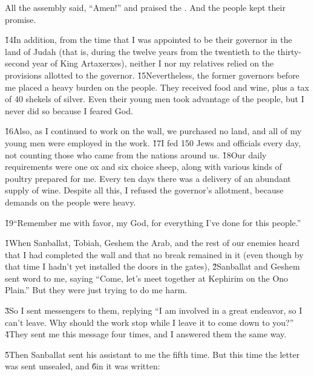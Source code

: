 All the assembly said, ``Amen!'' and praised the . And the people kept their promise.

\v{14}In addition, from the time that I was appointed to be their governor in the land of Judah (that is, during the twelve years from the twentieth to the thirty-second year of King Artaxerxes), neither I nor my relatives relied on the provisions allotted to the governor. \v{15}Nevertheless, the former governors before me placed a heavy burden on the people. They received food and wine, plus a tax of 40 shekels of silver. Even their young men took advantage of the people, but I never did so because I feared God.

\v{16}Also, as I continued to work on the wall, we purchased no land, and all of my young men were employed in the work. \v{17}I fed 150 Jews and officials every day, not counting those who came from the nations around us. \v{18}Our daily requirements were one ox and six choice sheep, along with various kinds of poultry prepared for me. Every ten days there was a delivery of an abundant supply of wine. Despite all this, I refused the governor's allotment, because demands on the people were heavy.

\v{19}``Remember me with favor, my God, for everything I've done for this people.''

\v{1}When Sanballat, Tobiah, Geshem the Arab, and the rest of our enemies heard that I had completed the wall and that no break remained in it (even though by that time I hadn't yet installed the doors in the gates), \v{2}Sanballat and Geshem sent word to me, saying ``Come, let's meet together at Kephirim on the Ono Plain.'' But they were just trying to do me harm.

\v{3}So I sent messengers to them, replying ``I am involved in a great endeavor, so I can't leave. Why should the work stop while I leave it to come down to you?'' \v{4}They sent me this message four times, and I answered them the same way.

\v{5}Then Sanballat sent his assistant to me the fifth time. But this time the letter was sent unsealed, and \v{6}in it was written:

